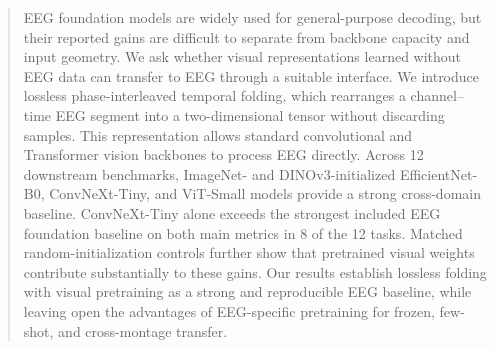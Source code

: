 \begin{abstract}
EEG foundation models are widely used for general-purpose decoding, but their
reported gains are difficult to separate from backbone capacity and input
geometry. We ask whether visual representations learned without EEG data can
transfer to EEG through a suitable interface. We introduce lossless phase-interleaved temporal folding, which rearranges a
channel--time EEG segment into a two-dimensional tensor without discarding
samples. This representation allows standard convolutional and Transformer
vision backbones to process EEG directly. Across 12 downstream benchmarks,
ImageNet- and DINOv3-initialized EfficientNet-B0, ConvNeXt-Tiny, and ViT-Small
models provide a strong cross-domain baseline. ConvNeXt-Tiny alone exceeds the strongest included EEG foundation
baseline on
both main metrics in 8 of the 12 tasks.
Matched random-initialization controls further show
that pretrained visual weights contribute substantially to these gains. Our results establish lossless folding with visual pretraining as a strong and
reproducible EEG baseline, while leaving open the advantages of EEG-specific
pretraining for frozen, few-shot, and cross-montage transfer.
\end{abstract}
